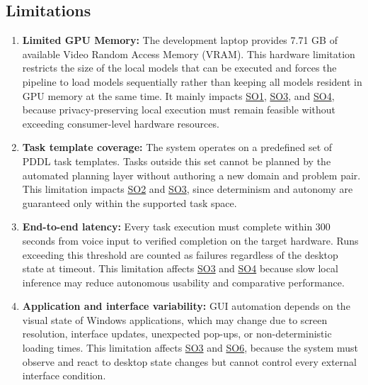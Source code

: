 \subsection{Limitations}

\begin{enumerate}
  \item \textbf{Limited GPU Memory:} The development laptop provides 7.71 GB of available Video Random Access Memory (VRAM). This hardware limitation restricts the size of the local models that can be executed and forces the pipeline to load models sequentially rather than keeping all models resident in GPU memory at the same time. It mainly impacts \hyperref[so:1]{SO1}, \hyperref[so:3]{SO3}, and \hyperref[so:4]{SO4}, because privacy-preserving local execution must remain feasible without exceeding consumer-level hardware resources.

  \item \textbf{Task template coverage:} The system operates on a predefined set of PDDL task templates. Tasks outside this set cannot be planned by the automated planning layer without authoring a new domain and problem pair. This limitation impacts \hyperref[so:2]{SO2} and \hyperref[so:3]{SO3}, since determinism and autonomy are guaranteed only within the supported task space.

  \item \textbf{End-to-end latency:} Every task execution must complete within 300 seconds from voice input to verified completion on the target hardware. Runs exceeding this threshold are counted as failures regardless of the desktop state at timeout. This limitation affects \hyperref[so:3]{SO3} and \hyperref[so:4]{SO4} because slow local inference may reduce autonomous usability and comparative performance.

  \item \textbf{Application and interface variability:} GUI automation depends on the visual state of Windows applications, which may change due to screen resolution, interface updates, unexpected pop-ups, or non-deterministic loading times. This limitation affects \hyperref[so:3]{SO3} and \hyperref[so:6]{SO6}, because the system must observe and react to desktop state changes but cannot control every external interface condition.
\end{enumerate}

